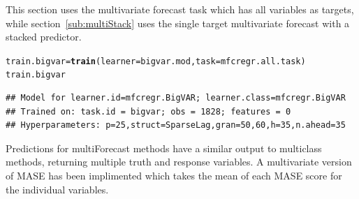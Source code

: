 \documentclass[12pt]{article}\usepackage[]{graphicx}\usepackage[]{color}
\makeatletter
\newcommand{\hlstd}[1]{\textcolor[rgb]{0.345,0.345,0.345}{#1}}%
\newcommand{\hlkwb}[1]{\textcolor[rgb]{0.69,0.353,0.396}{#1}}%
\newcommand{\hlkwc}[1]{\textcolor[rgb]{0.333,0.667,0.333}{#1}}%
\newcommand{\hlkwd}[1]{\textcolor[rgb]{0.737,0.353,0.396}{\textbf{#1}}}%
\newenvironment{kframe}{%
 \def\at@end@of@kframe{}%
 \ifinner\ifhmode%
  \def\at@end@of@kframe{\end{minipage}}%
  \begin{minipage}{\columnwidth}%
 \fi\fi%
 \def\FrameCommand##1{\hskip\@totalleftmargin \hskip-\fboxsep
 \colorbox{shadecolor}{##1}\hskip-\fboxsep
     \hskip-\linewidth \hskip-\@totalleftmargin \hskip\columnwidth}%
 \MakeFramed {\advance\hsize-\width
   \@totalleftmargin\z@ \linewidth\hsize
   \@setminipage}}%
 {\par\unskip\endMakeFramed%
 \at@end@of@kframe}
\newenvironment{knitrout}{}{} %
\theoremstyle{definition}
\newcommand\code{\@codex}
\def\@codex#1{{\normalfont\ttfamily\hyphenchar\font=-1 #1}}
\makeatother
\begin{document}
This section uses the multivariate forecast task which has all variables as targets, while section~\ref{sub:multiStack} uses the single target multivariate forecast with a stacked predictor.

\begin{knitrout}
\color{fgcolor}\begin{kframe}
\begin{alltt}
\hlstd{train.bigvar} \hlkwb{=} \hlkwd{train}\hlstd{(}\hlkwc{learner} \hlstd{= bigvar.mod,} \hlkwc{task} \hlstd{= mfcregr.all.task )}
\hlstd{train.bigvar}
\end{alltt}
\end{kframe}
\end{knitrout}

\begin{knitrout}
\color{fgcolor}\begin{kframe}
\begin{verbatim}
## Model for learner.id=mfcregr.BigVAR; learner.class=mfcregr.BigVAR
## Trained on: task.id = bigvar; obs = 1828; features = 0
## Hyperparameters: p=25,struct=SparseLag,gran=50,60,h=35,n.ahead=35
\end{verbatim}
\end{kframe}
\end{knitrout}
\doublespacing

Predictions for \code{multiForecast} methods have a similar output to \code{multiclass} methods, returning multiple truth and response variables. A multivariate version of MASE has been implimented which takes the mean of each MASE score for the individual variables.
\end{document}
